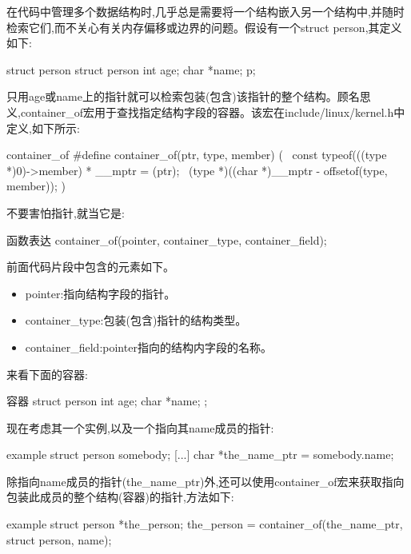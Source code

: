 \documentclass[lang=cn,newtx,10pt,scheme=chinese]{elegantbook}
\begin{document}
在代码中管理多个数据结构时,几乎总是需要将一个结构嵌入另一个结构中,并随时检索它们,而不关心有关内存偏移或边界的问题。假设有一个struct person,其定义如下:

\begin{mycode}{struct person}
struct person {
    int age;
    char *name;
} p;
\end{mycode}

只用age或name上的指针就可以检索包装(包含)该指针的整个结构。顾名思义,container\_of宏用于查找指定结构字段的容器。该宏在include/linux/kernel.h中定义,如下所示:

\begin{mycode}{container\_of}
#define container_of(ptr, type, member) ({                  \
    const typeof(((type *)0)->member) * __mptr = (ptr);     \
    (type *)((char *)__mptr - offsetof(type, member)); })
\end{mycode}

不要害怕指针,就当它是:

\begin{mycode}{函数表达}
    container_of(pointer, container_type, container_field);
\end{mycode}

前面代码片段中包含的元素如下。

\begin{itemize}
    \item pointer:指向结构字段的指针。
    \item container\_type:包装(包含)指针的结构类型。
    \item container\_field:pointer指向的结构内字段的名称。
\end{itemize}

来看下面的容器:

\begin{mycode}{容器}
struct person {
    int age;
    char *name;
};
\end{mycode}

现在考虑其一个实例,以及一个指向其name成员的指针:

\begin{mycode}{example}
struct person somebody;
[...]
char *the_name_ptr = somebody.name;
\end{mycode}

除指向name成员的指针(the\_name\_ptr)外,还可以使用container\_of宏来获取指向包装此成员的整个结构(容器)的指针,方法如下:

\begin{mycode}{example}
struct person *the_person;
the_person = container_of(the_name_ptr, struct person, name);
\end{mycode}
\end{document}
